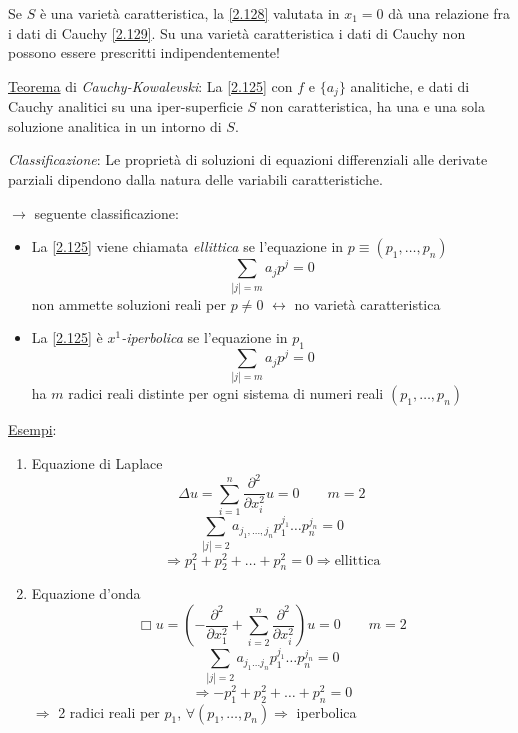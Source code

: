 \documentclass[a4paper,11pt]{report}
\begin{document}
Se $S$ \`e una variet\`a caratteristica, la \eqref{2.128} valutata in $x_1=0$ d\`a una relazione fra i dati di Cauchy \eqref{2.129}. Su una variet\`a caratteristica i dati di Cauchy non possono essere prescritti indipendentemente!

\medskip

\underline{Teorema} di \emph{Cauchy-Kowalevski}: La \eqref{2.125} con $f$ e $\{a_j\}$ analitiche, e dati di Cauchy analitici su una iper-superficie $S$ non caratteristica, ha una e una sola soluzione analitica in un intorno di $S$.

\medskip

\emph{Classificazione}: Le propriet\`a di soluzioni di equazioni differenziali alle derivate parziali dipendono dalla natura delle variabili caratteristiche.

$\rightarrow$ seguente classificazione:
\begin{itemize}
\item La \eqref{2.125} viene chiamata \emph{ellittica} se l'equazione in $p \equiv (p_1,\dots,p_n)$
\[
\sum_{|j|=m}a_jp^j=0
\]
non ammette soluzioni reali per $p\neq 0$ $\leftrightarrow$ no variet\`a caratteristica
\item La \eqref{2.125} \`e \emph{$x^1$-iperbolica} se l'equazione in $p_1$
\[
\sum_{|j|=m}a_jp^j=0
\]
ha $m$ radici reali distinte per ogni sistema di numeri reali $(p_1,\dots,p_n)$
\end{itemize}

\underline{Esempi}:
\begin{enumerate}[label=(\roman*)]
\item Equazione di Laplace
\[
\Delta u=\sum_{i=1}^n\frac{\partial^2}{\partial x_i^2}u=0 \qquad m=2
\]
\[
\sum_{|j|=2} a_{j_1,\dots,j_n}p_1^{j_1}\dots p^{j_n}_n=0
\]
\[
\Rightarrow p_1^2 + p_2^2 + \dots + p_n^2 =0 \Rightarrow \text{ellittica}
\]
\item Equazione d'onda
\[
\Box u =\left(-\frac{\partial^2}{\partial x_1^2}+\sum_{i=2}^n\frac{\partial^2}{\partial x_i^2} \right)u=0 \qquad m=2
\]
\[
\sum_{|j|=2} a_{j_1 \dots j_n}p_1^{j_1} \dots p_n^{j_n}=0
\]
\[
\Rightarrow -p_1^2 + p_2^2 + \ldots + p_n^2=0
\]
$ \Rightarrow$ 2 radici reali per $p_1$, $\forall (p_1,\ldots,p_n) \Rightarrow$ iperbolica
\end{enumerate}
\end{document}

